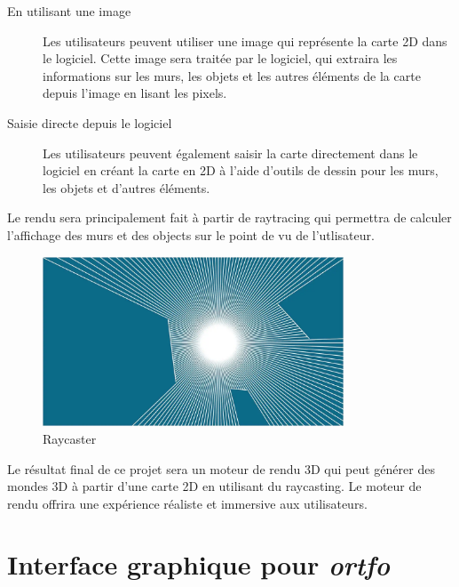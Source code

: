 \documentclass{article}
\begin{document}
\begin{description}
    \item[En utilisant une image] Les utilisateurs peuvent utiliser une image qui représente la carte 2D dans le logiciel. Cette image sera traitée par le logiciel, qui extraira les informations sur les murs, les objets et les autres éléments de la carte depuis l'image en lisant les pixels. 
    \item[Saisie directe depuis le logiciel] Les utilisateurs peuvent également saisir la carte directement dans le logiciel en créant la carte en 2D à l'aide d'outils de dessin pour les murs, les objets et d'autres éléments. 
\end{description}

Le rendu sera principalement fait à partir de raytracing qui permettra de calculer l'affichage des murs et des objects sur le point de vu de l'utlisateur.

\begin{figure}[H]
    \centering
    \includegraphics[width=0.8\textwidth]{raycaster}
    \caption{Raycaster}
    \label{fig:raycaster}
\end{figure}

Le résultat final de ce projet sera un moteur de rendu 3D qui peut générer des mondes 3D à partir d'une carte 2D en utilisant du raycasting. Le moteur de rendu offrira une expérience réaliste et immersive aux utilisateurs.

\newpage

    \section{Interface graphique pour \emph{ortfo} }
\end{document}
